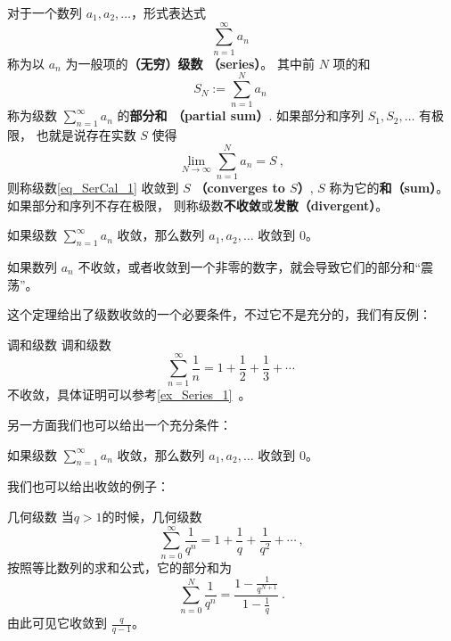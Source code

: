 
\begin{issues}
\issueDraft
\end{issues}


对于一个数列 $a_1,a_2,\dots$，形式表达式
\begin{equation}\label{eq_SerCal_1}
\sum_{n=1}^\infty a_n~
\end{equation}
称为以 $a_n$ 为一般项的\textbf{（无穷）级数 （series）}。 其中前 $N$ 项的和
\begin{equation}
S_N:=\sum_{n=1}^N a_n~
\end{equation}
称为级数 $\sum_{n=1}^\infty a_n$ 的\textbf{部分和 （partial sum）}. 如果部分和序列 $S_1,S_2,\dots$ 有极限， 也就是说存在实数 $S$ 使得
\begin{equation}
\lim_{N\to\infty}\sum_{n=1}^N a_n=S~,
\end{equation}
则称级数\autoref{eq_SerCal_1} 收敛到 $S$ \textbf{（converges to $S$）}, $S$ 称为它的\textbf{和（sum）}。 如果部分和序列不存在极限， 则称级数\textbf{不收敛}或\textbf{发散（divergent）}。

\begin{theorem}{}
如果级数 $\sum_{n=1}^\infty a_n$ 收敛，那么数列 $a_1, a_2, \dots$ 收敛到 $0$。
\end{theorem}
如果数列 $a_n$ 不收敛，或者收敛到一个非零的数字，就会导致它们的部分和“震荡”。

这个定理给出了级数收敛的一个必要条件，不过它不是充分的，我们有反例：
\begin{example}{调和级数}
调和级数
$$
\sum_{n=1}^\infty\frac{1}{n} = 1 + \frac12 + \frac13 + \cdots~
$$
不收敛，具体证明可以参考\autoref{ex_Series_1}~。
\end{example}

另一方面我们也可以给出一个充分条件：
\begin{theorem}{}
如果级数 $\sum_{n=1}^\infty a_n$ 收敛，那么数列 $a_1, a_2, \dots$ 收敛到 $0$。
\end{theorem}

我们也可以给出收敛的例子：
\begin{example}{几何级数}
当$q > 1$的时候，几何级数
$$
\sum_{n=0}^\infty \frac1{q^n} = 1 + \frac1{q} + \frac1{q^2} + \cdots~,
$$
按照等比数列的求和公式，它的部分和为
$$
\sum_{n=0}^N \frac1{q^n} =\frac{1 - \frac1{q^{N+1}}}{1 - \frac1{q}}~.
$$
由此可见它收敛到 $\frac{q}{q - 1}$。
\end{example}






